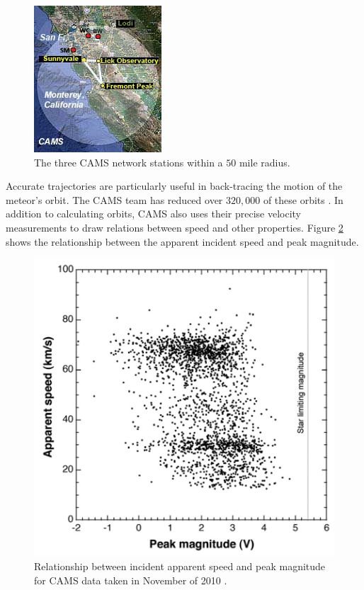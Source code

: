 \begin{figure}[ht!]
  \centering
  \includegraphics[scale=0.7]{images/CAMS_trio.jpg}
  \caption{The three CAMS network stations within a $50$ mile radius.}
  \label{trio}
\end{figure}

Accurate trajectories are particularly useful in back-tracing the motion of the meteor's orbit.  
The CAMS team has reduced over $320,000$ of these orbits \cite{noauthor_cameras_nodate}. 
In addition to calculating orbits, CAMS also uses their precise velocity measurements to draw relations between speed and other properties. 
Figure \ref{fancyCAMS} shows the relationship between the apparent incident speed and peak magnitude.

\begin{figure}[ht!]
  \centering
  \includegraphics[scale=0.6]{images/CAMS_plot.png}
  \caption{Relationship between incident apparent speed and peak magnitude for CAMS data taken in November of 2010 \cite{jenniskens_cams:_2011}.}
  \label{fancyCAMS}
\end{figure}


